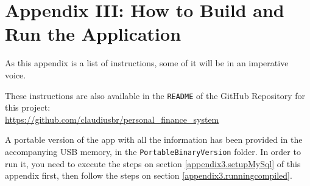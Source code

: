 \section{Appendix III: How to Build and Run the Application} \label{appendix3}

\noindent
As this appendix is a list of instructions, some of it will be in an imperative
voice.

\noindent
These instructions are also available in the \texttt{README} of the GitHub
Repository for this project:\\
\href{https://github.com/claudiusbr/personal_finance_system}{https://github.com/claudiusbr/personal\_finance\_system} 

\noindent
A portable version of the app with all the information has been provided in the
accompanying USB memory, in the \texttt{PortableBinaryVersion} folder. In order
to run it, you need to execute the steps on section \ref{appendix3.setupMySql}
of this appendix first, then follow the steps on section
\ref{appendix3.runningcompiled}.


